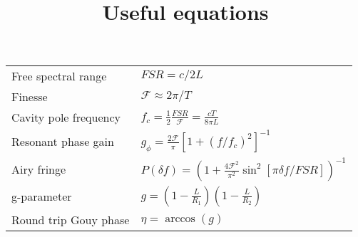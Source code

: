 \documentclass{article}
\begin{document}
\title{Useful equations}
\maketitle

\Large
\begin{tabular}{p{2in}p{4in}}
  Free spectral range & $FSR = c/2 L$\\
  Finesse & $ \mathcal{F} \approx 2 \pi/ T$ \\
  Cavity pole frequency & $f_c = \frac{1}{2}\frac{FSR}{\mathcal{F}}=\frac{cT}{8\pi L}$\\
  Resonant phase gain & $g_\phi = \frac{2 \mathcal{F}}{\pi}\left[1+\left(f/f_c\right)^2\right]^{-1}$\\
  Airy fringe & $P(\delta f) = \left (1 + \frac{4 \mathcal{F}^2}{\pi^2} \sin^2 [
  \pi \delta f / FSR ] \right)^{-1} $ \\
  g-parameter & $g = (1 - \frac{L}{R_1})(1 - \frac{L}{R_2})$ \\
  Round trip Gouy phase & $\eta = \arccos(g)$ 

\end{tabular}
\end{document}
